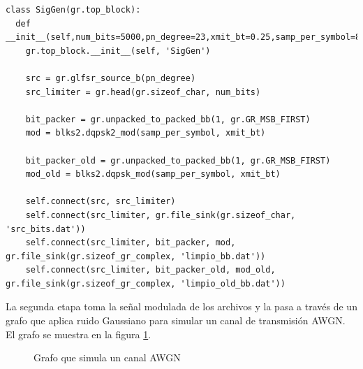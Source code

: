 \begin{lstlisting}[float, label=ex:siggen, caption={C\'odigo que implementa el grafo
generador de se\~nales.}, breaklines=true]
class SigGen(gr.top_block):
  def __init__(self,num_bits=5000,pn_degree=23,xmit_bt=0.25,samp_per_symbol=8):
    gr.top_block.__init__(self, 'SigGen')
	
	src = gr.glfsr_source_b(pn_degree)
	src_limiter = gr.head(gr.sizeof_char, num_bits)

    bit_packer = gr.unpacked_to_packed_bb(1, gr.GR_MSB_FIRST)
    mod = blks2.dqpsk2_mod(samp_per_symbol, xmit_bt)

    bit_packer_old = gr.unpacked_to_packed_bb(1, gr.GR_MSB_FIRST)
    mod_old = blks2.dqpsk_mod(samp_per_symbol, xmit_bt)

    self.connect(src, src_limiter)
    self.connect(src_limiter, gr.file_sink(gr.sizeof_char, 'src_bits.dat'))
    self.connect(src_limiter, bit_packer, mod, gr.file_sink(gr.sizeof_gr_complex, 'limpio_bb.dat'))
    self.connect(src_limiter, bit_packer_old, mod_old, gr.file_sink(gr.sizeof_gr_complex, 'limpio_old_bb.dat'))
\end{lstlisting}

La segunda etapa toma la se\~nal modulada de los archivos y la pasa a trav\'es de un grafo que
aplica ruido Gaussiano para simular un canal de transmisi\'on AWGN. El grafo se muestra en la figura
\ref{fig:noisegen}.

\begin{figure}[htp]
  \centering
  \vspace{0.3in}
  \vspace{0.3in}
  \caption{Grafo que simula un canal AWGN}
  \label{fig:noisegen}
\end{figure}


